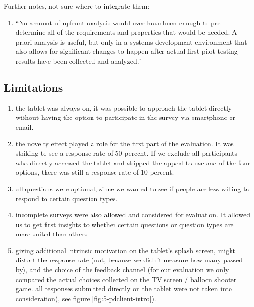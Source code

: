 	Further notes, not sure where to integrate them:
	\begin{enumerate}
	\item ``No amount of upfront analysis would ever have been enough to pre- determine all of the requirements and properties that would be needed. A priori analysis is useful, but only in a systems development environment that also allows for significant changes to happen after actual first pilot testing results have been collected and analyzed.'' \cite{russell2004use}
	\end{enumerate}








\subsection{Limitations}

	\begin{enumerate}
	\item the tablet was always on, it was possible to approach the tablet directly without having the option to participate in the survey via smartphone or email. 
	\item the novelty effect played a role for the first part of the evaluation. It was striking to see a response rate of 50 percent. If we exclude all participants who directly accessed the tablet and skipped the appeal to use one of the four options, there was still a response rate of 10 percent.
	\item all questions were optional, since we wanted to see if people are less willing to respond to certain question types.
	\item incomplete surveys were also allowed and considered for evaluation. It allowed us to get first insights to whether certain questions or question types are more suited than others.
	\item giving additional intrinsic motivation on the tablet's splash screen, might distort the response rate (not, because we didn't measure how many passed by), and the choice of the feedback channel (for our evaluation we only compared the actual choices collected on the TV screen / balloon shooter game. all responses submitted directly on the tablet were not taken into consideration), see figure \ref{fig:5-pdclient-intro}).
	\end{enumerate}

